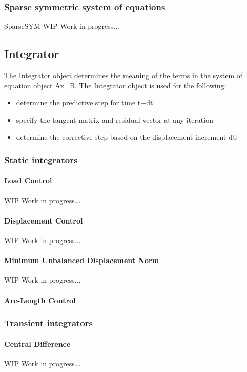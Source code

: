 \subsubsection{Sparse symmetric system of equations}
SparseSYM WIP Work in progress...

\subsection{Integrator}
The Integrator object determines the meaning of the terms in the system of equation object Ax=B. The Integrator object is used for the following:
\begin{itemize}
\item determine the predictive step for time t+dt
\item specify the tangent matrix and residual vector at any iteration
\item determine the corrective step based on the displacement increment dU
\end{itemize}

\subsubsection{Static integrators}

\paragraph{Load Control}
WIP Work in progress...

\paragraph{Displacement Control}
WIP Work in progress...

\paragraph{Minimum Unbalanced Displacement Norm}
WIP Work in progress...

\paragraph{Arc-Length Control}
    
\subsubsection{Transient integrators}

\paragraph{Central Difference}
WIP Work in progress...

